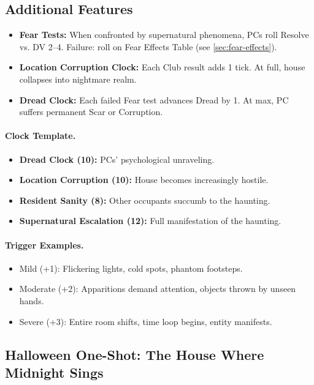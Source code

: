 \documentclass[11pt]{article}
\begin{document}
\subsection*{Additional Features}
\begin{itemize}
\item \textbf{Fear Tests:} When confronted by supernatural phenomena, PCs roll Resolve vs. DV 2–4. Failure: roll on Fear Effects Table (see \ref{sec:fear-effects}).
\item \textbf{Location Corruption Clock:} Each Club result adds 1 tick. At full, house collapses into nightmare realm.
\item \textbf{Dread Clock:} Each failed Fear test advances Dread by 1. At max, PC suffers permanent Scar or Corruption.
\end{itemize}

\paragraph{Clock Template.}
\begin{itemize}
  \item \textbf{Dread Clock (10):} PCs’ psychological unraveling.
  \item \textbf{Location Corruption (10):} House becomes increasingly hostile.
  \item \textbf{Resident Sanity (8):} Other occupants succumb to the haunting.
  \item \textbf{Supernatural Escalation (12):} Full manifestation of the haunting.
\end{itemize}

\paragraph{Trigger Examples.}
\begin{itemize}
  \item Mild (+1): Flickering lights, cold spots, phantom footsteps.
  \item Moderate (+2): Apparitions demand attention, objects thrown by unseen hands.
  \item Severe (+3): Entire room shifts, time loop begins, entity manifests.
\end{itemize}

\subsection{Halloween One-Shot: The House Where Midnight Sings}
\end{document}
